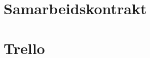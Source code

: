 \newpage
{}
\begin{appendices}
\setcounter{page}{1}


\chapter{Samarbeidskontrakt}
\begin{figure}[h]
    \centering
    
    \label{vedlegg:Samarbeidskontrakt}
\end{figure}



\chapter{Trello}

\begin{figure}[h]
    \centering
    
    \label{vedlegg:Trello}
\end{figure}



\end{appendices}

